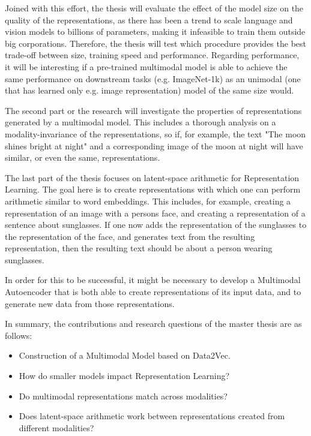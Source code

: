 Joined with this effort, the thesis will evaluate the effect
of the model size on the quality of the representations, as there has been a trend to 
scale language and vision models to billions of parameters, making it infeasible to train
them outside big corporations. Therefore, the thesis will test which procedure provides the best trade-off between size,
training speed and performance.
Regarding performance, it will be interesting if a pre-trained multimodal model is able to 
achieve the same performance on downstream tasks (e.g. ImageNet-1k) as an 
unimodal (one that has learned only e.g. image representation) model of the same size would.

The second part or the research will investigate the properties of
representations generated by a multimodal model. This includes a thorough analysis on a modality-invariance
of the representations, so if, for example, the text "The moon shines bright at night"
and a corresponding image of the moon at night will have similar, or even the same, representations.

The last part of the thesis focuses on latent-space arithmetic for Representation Learning.
The goal here is to create representations with which one can perform arithmetic similar to word embeddings.
This includes, for example, creating a representation of an image with a persons face, and creating
a representation of a sentence about sunglasses. If one now adds the representation of the sunglasses to
the representation of the face, and generates text from the resulting representation, then the resulting text
should be about a person wearing sunglasses.

In order for this to be successful, it might be necessary to develop a Multimodal Autoencoder that is both
able to create representations of its input data, and to generate new data from those representations.

In summary, the contributions and research questions of the master thesis are as follows:

\begin{itemize}
	\item Construction of a Multimodal Model based on Data2Vec.
	\item How do smaller models impact Representation Learning?
    \item Do multimodal representations match across modalities?
	\item Does latent-space arithmetic work between representations created from different modalities?
\end{itemize}


